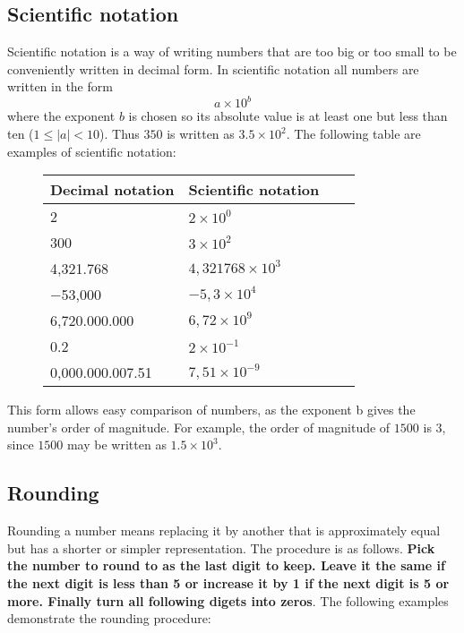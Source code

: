 \subsection{Scientific notation}
Scientific notation is a way of writing numbers that are too big or too small to be conveniently written in decimal form. In scientific notation all numbers are written in the form
\[
a \times 10^b
\]
where the exponent $b$ is chosen so its absolute value is at least one but less than ten ($1 \leq |a| < 10$). Thus $350$ is written as $3.5×10^2$. The following table are examples of scientific notation:
\begin{figure}[H]
\centering
\begin{tabular}{|l|l|l|l|}
\hline
\textbf{Decimal notation}   & \textbf{Scientific notation} \\ \hline
2                           & $2 \times 10^0$              \\ \hline
300                         & $3 \times 10^2$              \\ \hline
4,321.768                   & $4,321768 \times 10^3$       \\ \hline
−53,000                     & $−5,3 \times 10^4$           \\ \hline
6,720.000.000	           & $6,72 \times 10^9$           \\ \hline
0.2	                        & $2 \times 10^{−1}$           \\ \hline
0,000.000.007.51	           & $7,51 \times 10^{−9}$        \\ \hline
\end{tabular}
\end{figure}
This form allows easy comparison of numbers, as the exponent b gives the number's order of magnitude. For example, the order of magnitude of $1500$ is $3$, since $1500$ may be written as $1.5 × 10^3$.

\subsection{Rounding}
Rounding a number means replacing it by another that is approximately equal but has a shorter or simpler representation. The procedure is as follows. \textbf{Pick the number to round to as the last digit to keep. Leave it the same if the next digit is less than 5 or increase it by 1 if the next digit is 5 or more. Finally turn all following digets into zeros}. The following examples demonstrate the rounding procedure:

